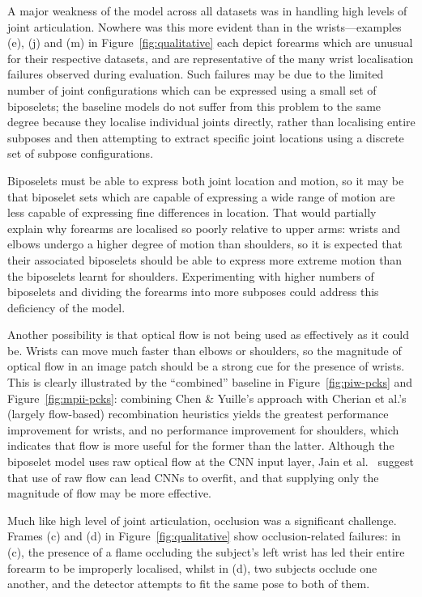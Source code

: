 \documentclass[runningheads]{llncs}
\begin{document}
A major weakness of the model across all datasets was in handling high levels of
joint articulation. Nowhere was this more evident than in the wrists---examples
(e), (j) and (m) in Figure~\ref{fig:qualitative} each depict forearms which are
unusual for their respective datasets, and are representative of the many wrist
localisation failures observed during evaluation. Such failures may be due to
the limited number of joint configurations which can be expressed using a small
set of biposelets; the baseline models do not suffer from this problem to the
same degree because they localise individual joints directly, rather than
localising entire subposes and then attempting to extract specific joint
locations using a discrete set of subpose configurations.

Biposelets must be able to express both joint location and motion, so it may be
that biposelet sets which are capable of expressing a wide range of motion are
less capable of expressing fine differences in location. That would partially
explain why forearms are localised so poorly relative to upper arms: wrists and
elbows undergo a higher degree of motion than shoulders, so it is expected that
their associated biposelets should be able to express more extreme motion than
the biposelets learnt for shoulders. Experimenting with higher numbers of
biposelets and dividing the forearms into more subposes could address this
deficiency of the model.

Another possibility is that optical flow is not being used as effectively as it
could be. Wrists can move much faster than elbows or shoulders, so the magnitude
of optical flow in an image patch should be a strong cue for the presence of
wrists. This is clearly illustrated by the ``combined'' baseline in
Figure~\ref{fig:piw-pcks} and Figure~\ref{fig:mpii-pcks}: combining Chen \&
Yuille's approach with Cherian et al.'s (largely flow-based) recombination
heuristics yields the greatest performance improvement for wrists, and no
performance improvement for shoulders, which indicates that flow is more useful
for the former than the latter. Although the biposelet model uses raw optical
flow at the CNN input layer, Jain et al.~\cite{jain2014modeep} suggest that use
of raw flow can lead CNNs to overfit, and that supplying only the magnitude of
flow may be more effective.

Much like high level of joint articulation, occlusion was a significant
challenge. Frames (c) and (d) in Figure~\ref{fig:qualitative} show
occlusion-related failures: in (c), the presence of a flame occluding the
subject's left wrist has led their entire forearm to be improperly localised,
whilst in (d), two subjects occlude one another, and the detector attempts to
fit the same pose to both of them.
\end{document}
